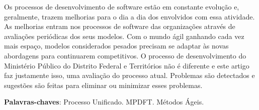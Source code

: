 \documentclass[
	article,			%
	11pt,				%
	oneside,			%
	a4paper,			%
	english,			%
	brazil,				%
	sumario=tradicional
	]{abntex2}
\begin{document}
\frenchspacing 







%
% 

%
%
\maketitle

\begin{resumoumacoluna}

   Os processos de desenvolvimento de software estão em constante evolução e,
   geralmente, trazem melhorias para o dia a dia dos envolvidos com essa
   atividade. As melhorias entram nos processos de software das organizações
   através de avaliações periódicas dos seus modelos. Com o mundo ágil ganhando
   cada vez mais espaço, modelos considerados pesados precisam se adaptar às
   novas abordagens para continuarem competitivos. O processo de desenvolvimento
   do Ministério Público do Distrito Federal e Territórios não é diferente e
   este artigo faz justamente isso, uma avaliação do processo atual. Problemas
   são detectados e sugestões são feitas para eliminar ou minimizar esses
   problemas.

   \vspace{\onelineskip}

   \noindent
   \textbf{Palavras-chaves}: Processo Unificado. MPDFT. Métodos Ágeis.
\end{resumoumacoluna}
\end{document}
